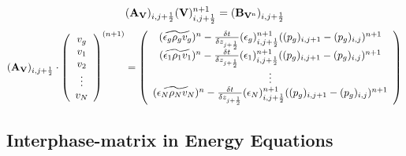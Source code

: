 %
\begin{eqnarray}
\htmlimage{}
({\bf A_V})_{i,j+\frac{1}{2}} ({\bf V})_{i,j+\frac{1}{2}}^{n+1} = 
({\bf B_{V^{\rm n}}})_{i,j+\frac{1}{2}}
\nonumber
\end{eqnarray}
%
\begin{eqnarray}
\htmlimage{}
({\bf A_V})_{i,j+\frac{1}{2}} \cdot \left( \begin{array}{c}
v_g \\
v_1 \\
v_2 \\
\vdots \\
v_N  \end{array} \right )^{(n+1)} = \left( \begin{array}{c}
(\widetilde {\epsilon_g \rho_g v_g})^n - 
\frac{\delta t}{\delta z_{j+\frac{1}{2}}} 
(\epsilon_g)_{i,j+\frac{1}{2}}^{n+1} ((p_g)_{i,j+1} - (p_g)_{i,j})^{n+1}     \\
(\widetilde {\epsilon_1 \rho_1 v_1})^n - 
\frac{\delta t}{\delta z_{j+\frac{1}{2}}} 
(\epsilon_1)_{i,j+\frac{1}{2}}^{n+1} ((p_g)_{i,j+1} - (p_g)_{i,j})^{n+1}     \\
\vdots       \\
(\widetilde {\epsilon_N \rho_N v_N})^n - 
\frac{\delta t}{\delta z_{j+\frac{1}{2}}}
(\epsilon_N)_{i,j+\frac{1}{2}}^{n+1} ((p_g)_{i,j+1} - (p_g)_{i,j})^{n+1}
\end{array} \right )
\nonumber
\end{eqnarray}
%
%
\newpage
\subsection{Interphase-matrix in Energy Equations}

